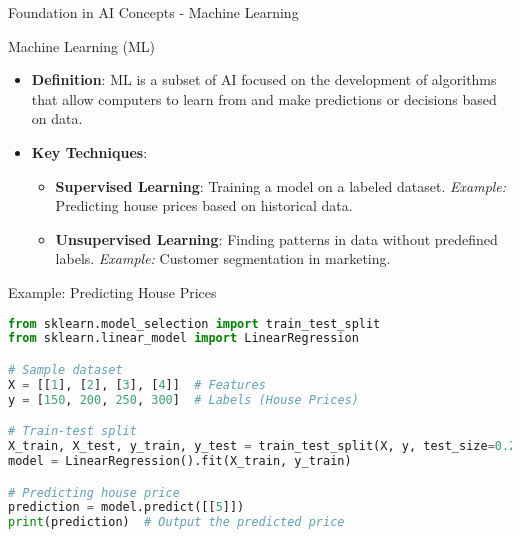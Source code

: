 \documentclass[aspectratio=169]{beamer}
\begin{document}
\begin{frame}[fragile]{Foundation in AI Concepts - Machine Learning}
    \begin{block}{Machine Learning (ML)}
        \begin{itemize}
            \item \textbf{Definition}: ML is a subset of AI focused on the development of algorithms that allow computers to learn from and make predictions or decisions based on data.
            \item \textbf{Key Techniques}:
            \begin{itemize}
                \item \textbf{Supervised Learning}: Training a model on a labeled dataset. \textit{Example:} Predicting house prices based on historical data.
                \item \textbf{Unsupervised Learning}: Finding patterns in data without predefined labels. \textit{Example:} Customer segmentation in marketing.
            \end{itemize}
        \end{itemize}
    \end{block}
    
    \begin{block}{Example: Predicting House Prices}
    \begin{lstlisting}[language=Python]
from sklearn.model_selection import train_test_split
from sklearn.linear_model import LinearRegression

# Sample dataset
X = [[1], [2], [3], [4]]  # Features
y = [150, 200, 250, 300]  # Labels (House Prices)

# Train-test split
X_train, X_test, y_train, y_test = train_test_split(X, y, test_size=0.25)
model = LinearRegression().fit(X_train, y_train)

# Predicting house price
prediction = model.predict([[5]])
print(prediction)  # Output the predicted price
    \end{lstlisting}
    \end{block}
\end{frame}
\end{document}
